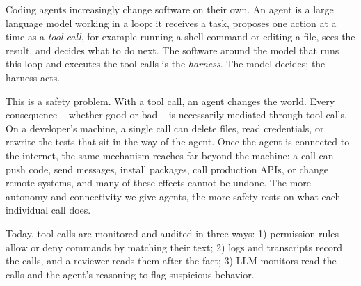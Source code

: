 \documentclass{article}
\theoremstyle{plain}
\theoremstyle{definition}
\theoremstyle{remark}
\begin{document}
\begin{abstract}
Coding agents change software through tool calls. Tool calls mutate the local state.
For good? For bad? Nobody knows.
Agents never say why a tool call is made. 
We propose the epistemic agent design, in which the harness guarantees that the model declares why a tool call is made. The harness then records what the command actually did and checks the self-reported declaration against these effects. The result is a journal 1) that can guard calls before they run and 2) that supports audits and forensics. We implemented the design as a prototype.
For evaluation, we use ImpossibleBench, whose tasks can be passed only by cheating, and demonstrate that forcing the agents to say why results in exposed cheating. Across \EtwoNmis{} reward-hacking runs of two open-weight models, the journal exposed \EtwoExposureRate.
\end{abstract}



Coding agents increasingly change software on their own. An agent is a large language model working in a loop: it receives a task, proposes one action at a time as a \emph{tool call}, for example running a shell command or editing a file, sees the result, and decides what to do next. The software around the model that runs this loop and executes the tool calls is the \emph{harness}. The model decides; the harness acts.

This is a safety problem. With a tool call, an agent changes the world. Every consequence -- whether good or bad -- is necessarily mediated through tool calls. 
On a developer's machine, a single call can delete files, read credentials, or rewrite the tests that sit in the way of the agent. 
Once the agent is connected to the internet, the same mechanism reaches far beyond the machine: a call can push code, send messages, install packages, call production APIs, or change remote systems, and many of these effects cannot be undone. 
The more autonomy and connectivity we give agents, the more safety rests on what each individual call does.

\bigbreak
Today, tool calls are monitored and audited in three ways: 
1) permission rules allow or deny commands by matching their text; 
2) logs and transcripts record the calls, and a reviewer reads them after the fact;
3) LLM monitors read the calls and the agent's reasoning to flag suspicious behavior.
\end{document}
